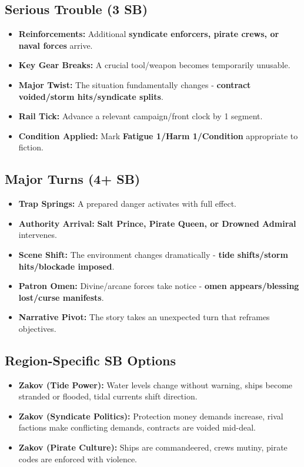 \subsection*{Serious Trouble (3 SB)}
\begin{itemize}
\item \textbf{Reinforcements:} Additional \textbf{syndicate enforcers, pirate crews, or naval forces} arrive.
\item \textbf{Key Gear Breaks:} A crucial tool/weapon becomes temporarily unusable.
\item \textbf{Major Twist:} The situation fundamentally changes - \textbf{contract voided/storm hits/syndicate splits}.
\item \textbf{Rail Tick:} Advance a relevant campaign/front clock by 1 segment.
\item \textbf{Condition Applied:} Mark \textbf{Fatigue 1/Harm 1/Condition} appropriate to fiction.
\end{itemize}

\subsection*{Major Turns (4+ SB)}
\begin{itemize}
\item \textbf{Trap Springs:} A prepared danger activates with full effect.
\item \textbf{Authority Arrival:} \textbf{Salt Prince, Pirate Queen, or Drowned Admiral} intervenes.
\item \textbf{Scene Shift:} The environment changes dramatically - \textbf{tide shifts/storm hits/blockade imposed}.
\item \textbf{Patron Omen:} Divine/arcane forces take notice - \textbf{omen appears/blessing lost/curse manifests}.
\item \textbf{Narrative Pivot:} The story takes an unexpected turn that reframes objectives.
\end{itemize}

\subsection*{Region-Specific SB Options}
\begin{itemize}
\item \textbf{Zakov (Tide Power):} Water levels change without warning, ships become stranded or flooded, tidal currents shift direction.
\item \textbf{Zakov (Syndicate Politics):} Protection money demands increase, rival factions make conflicting demands, contracts are voided mid-deal.
\item \textbf{Zakov (Pirate Culture):} Ships are commandeered, crews mutiny, pirate codes are enforced with violence.
\end{itemize}
